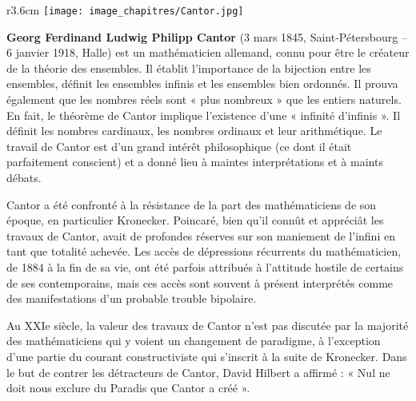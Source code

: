 
\begin{His}

\begin{wrapfigure}[11]{r}{3.6cm}
\vspace{-7mm}
\texttt{[image: image\_chapitres/Cantor.jpg]}
\end{wrapfigure}

\textbf{Georg Ferdinand Ludwig Philipp Cantor} (3 mars 1845, Saint-Pétersbourg – 6 janvier 1918, Halle) est un mathématicien allemand, connu pour être le créateur de la théorie des ensembles. Il établit l'importance de la bijection entre les ensembles, définit les ensembles infinis et les ensembles bien ordonnés. Il prouva également que les nombres réels sont « plus nombreux » que les entiers naturels. En fait, le théorème de Cantor implique l'existence d'une « infinité d'infinis ». Il définit les nombres cardinaux, les nombres ordinaux et leur arithmétique. Le travail de Cantor est d'un grand intérêt philosophique (ce dont il était parfaitement conscient) et a donné lieu à maintes interprétations et à maints débats.

\vspace{0.4cm}

Cantor a été confronté à la résistance de la part des mathématiciens de son époque, en particulier Kronecker. Poincaré, bien qu'il connût et appréciât les travaux de Cantor, avait de profondes réserves sur son maniement de l'infini en tant que totalité achevée. Les accès de dépressions récurrents du mathématicien, de 1884 à la fin de sa vie, ont été parfois attribués à l'attitude hostile de certains de ses contemporains, mais ces accès sont souvent à présent interprétés comme des manifestations d'un probable trouble bipolaire.

\vspace{0.4cm}

Au XXIe siècle, la valeur des travaux de Cantor n'est pas discutée par la majorité des mathématiciens qui y voient un changement de paradigme, à l'exception d'une partie du courant constructiviste qui s'inscrit à la suite de Kronecker. Dans le but de contrer les détracteurs de Cantor, David Hilbert a affirmé : « Nul ne doit nous exclure du Paradis que Cantor a créé ».

\vspace{0.4cm}


\end{His}
